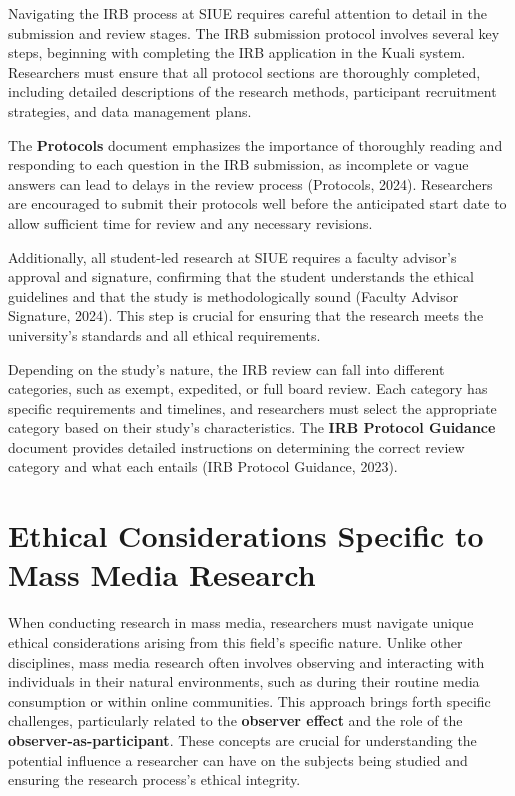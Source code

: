 \documentclass[
]{book}
\begin{document}
Navigating the IRB process at SIUE requires careful attention to detail in the submission and review stages. The IRB submission protocol involves several key steps, beginning with completing the IRB application in the Kuali system. Researchers must ensure that all protocol sections are thoroughly completed, including detailed descriptions of the research methods, participant recruitment strategies, and data management plans.

The \textbf{Protocols} document emphasizes the importance of thoroughly reading and responding to each question in the IRB submission, as incomplete or vague answers can lead to delays in the review process (Protocols, 2024). Researchers are encouraged to submit their protocols well before the anticipated start date to allow sufficient time for review and any necessary revisions.

Additionally, all student-led research at SIUE requires a faculty advisor's approval and signature, confirming that the student understands the ethical guidelines and that the study is methodologically sound (Faculty Advisor Signature, 2024). This step is crucial for ensuring that the research meets the university's standards and all ethical requirements.

Depending on the study's nature, the IRB review can fall into different categories, such as exempt, expedited, or full board review. Each category has specific requirements and timelines, and researchers must select the appropriate category based on their study's characteristics. The \textbf{IRB Protocol Guidance} document provides detailed instructions on determining the correct review category and what each entails (IRB Protocol Guidance, 2023).

\section{Ethical Considerations Specific to Mass Media Research}\label{ethical-considerations-specific-to-mass-media-research}

When conducting research in mass media, researchers must navigate unique ethical considerations arising from this field's specific nature. Unlike other disciplines, mass media research often involves observing and interacting with individuals in their natural environments, such as during their routine media consumption or within online communities. This approach brings forth specific challenges, particularly related to the \textbf{observer effect} and the role of the \textbf{observer-as-participant}. These concepts are crucial for understanding the potential influence a researcher can have on the subjects being studied and ensuring the research process's ethical integrity.
\end{document}
